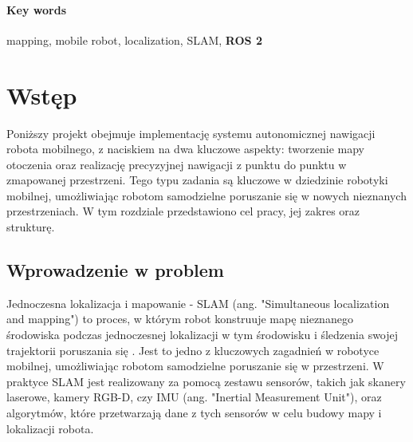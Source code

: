 \documentclass[a4paper,twoside,12pt]{book}
\newcounter{stronyPozaNumeracja}
\begin{document}
\subsubsection*{Key words}  
\begin{otherlanguage}{british}
mapping, mobile robot, localization, SLAM, \textbf{ROS 2}
\end{otherlanguage}




\tableofcontents

\setcounter{stronyPozaNumeracja}{\value{page}}
\mainmatter
\pagestyle{empty}

\cleardoublepage

\pagestyle{NumeryStronNazwyRozdzialow}


\chapter{Wstęp}
\label{ch:wstep}
Poniższy projekt obejmuje implementację systemu autonomicznej nawigacji robota mobilnego, z naciskiem na dwa kluczowe aspekty: tworzenie mapy otoczenia oraz realizację precyzyjnej nawigacji z punktu do punktu w zmapowanej przestrzeni. Tego typu zadania są kluczowe w dziedzinie robotyki mobilnej, umożliwiając robotom samodzielne poruszanie się w nowych nieznanych przestrzeniach.
W tym rozdziale przedstawiono cel pracy, jej zakres oraz strukturę.

\section{Wprowadzenie w problem} 
Jednoczesna lokalizacja i mapowanie - SLAM (ang. "Simultaneous localization and mapping") to proces, w którym robot konstruuje mapę nieznanego środowiska podczas jednoczesnej lokalizacji w tym środowisku i śledzenia swojej trajektorii poruszania się \cite{bib:mediumslam}. Jest to jedno z kluczowych zagadnień w robotyce mobilnej, umożliwiając robotom samodzielne poruszanie się w przestrzeni. W praktyce SLAM jest realizowany za pomocą zestawu sensorów, takich jak skanery laserowe, kamery RGB-D, czy IMU (ang. "Inertial Measurement Unit"), oraz algorytmów, które przetwarzają dane z tych sensorów w celu budowy mapy i lokalizacji robota.
\newpage
\end{document}
